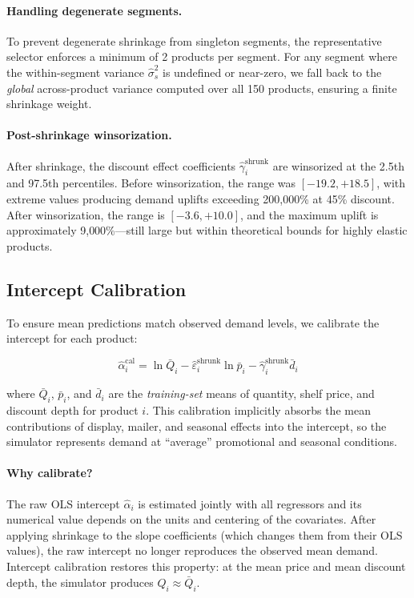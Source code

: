 \documentclass[12pt,a4paper]{article}
\begin{document}
\paragraph{Handling degenerate segments.}
To prevent degenerate shrinkage from singleton segments, the
representative selector enforces a minimum of 2 products per
segment. For any segment where the within-segment
variance $\hat{\sigma}_s^2$ is undefined or near-zero, we fall
back to the \emph{global} across-product variance computed over all
150 products, ensuring a finite shrinkage weight.

\paragraph{Post-shrinkage winsorization.}
After shrinkage, the discount effect coefficients
$\hat{\gamma}_i^{\text{shrunk}}$ are winsorized at the 2.5th and
97.5th percentiles.  Before winsorization, the range was
$[-19.2, +18.5]$, with extreme values producing demand uplifts
exceeding 200{,}000\% at 45\% discount.  After winsorization, the
range is $[-3.6, +10.0]$, and the maximum uplift is approximately
9{,}000\%---still large but within theoretical bounds for
highly elastic products.

\subsection{Intercept Calibration}
\label{sec:calibration}

To ensure mean predictions match observed demand levels, we
calibrate the intercept for each product:

\begin{equation}
\label{eq:intercept-cal}
\hat{\alpha}_i^{\text{cal}} = \ln \bar{Q}_i
- \hat{\varepsilon}_i^{\text{shrunk}} \ln \bar{p}_i
- \hat{\gamma}_i^{\text{shrunk}} \bar{d}_i
\end{equation}

where $\bar{Q}_i$, $\bar{p}_i$, and $\bar{d}_i$ are the
\emph{training-set} means of quantity, shelf price, and discount
depth for product $i$.  This calibration implicitly absorbs the mean
contributions of display, mailer, and seasonal effects into the
intercept, so the simulator represents demand at ``average''
promotional and seasonal conditions.

\paragraph{Why calibrate?}
The raw OLS intercept $\hat{\alpha}_i$ is estimated jointly with all
regressors and its numerical value depends on the units and centering
of the covariates.  After applying shrinkage to the slope
coefficients (which changes them from their OLS values), the raw
intercept no longer reproduces the observed mean demand.  Intercept
calibration restores this property: at the mean price and mean
discount depth, the simulator produces $\hat{Q}_i \approx \bar{Q}_i$.
\end{document}
